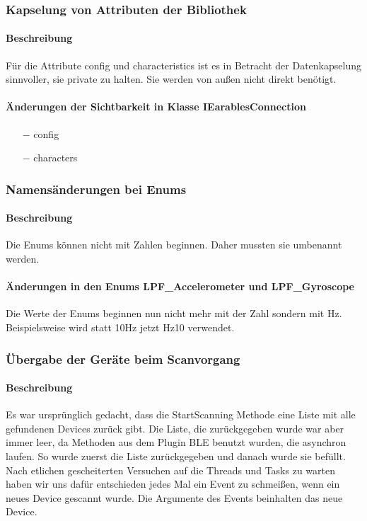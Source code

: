 \documentclass[a4paper,12pt]{article}
\begin{document}
\subsubsection{Kapselung von Attributen der Bibliothek}
\paragraph{Beschreibung}
Für die Attribute config und characteristics ist es in Betracht der Datenkapselung sinnvoller, sie private zu halten. Sie werden von außen nicht direkt benötigt.
\paragraph{Änderungen der Sichtbarkeit in Klasse IEarablesConnection}
\begin{itemize}
	\item[$-$] config
	\item[$-$] characters
\end{itemize}


\subsubsection{Namensänderungen bei Enums}
\paragraph{Beschreibung}
Die Enums können nicht mit Zahlen beginnen. Daher mussten sie umbenannt werden.
\paragraph{Änderungen in den Enums LPF\_Accelerometer und LPF\_Gyroscope}
Die Werte der Enums beginnen nun nicht mehr mit der Zahl sondern mit Hz. \\
Beispielsweise wird statt 10Hz jetzt Hz10 verwendet.

\subsubsection{Übergabe der Geräte beim Scanvorgang}
\paragraph{Beschreibung}
Es war ursprünglich gedacht, dass die StartScanning Methode eine Liste mit alle gefundenen Devices zurück gibt. Die Liste, die zurückgegeben wurde war aber immer leer, da Methoden aus dem Plugin BLE benutzt wurden, die asynchron laufen. So wurde zuerst die Liste zurückgegeben und danach wurde sie befüllt. Nach etlichen gescheiterten Versuchen auf die Threads und Tasks zu warten haben wir uns dafür entschieden jedes Mal ein Event zu schmeißen, wenn ein neues Device gescannt wurde. Die Argumente des Events beinhalten das neue Device.
\end{document}
